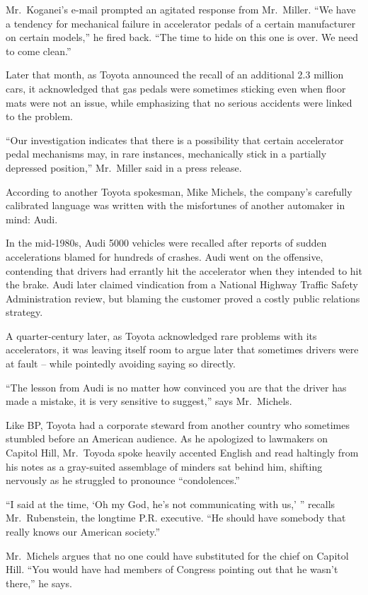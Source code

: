 ﻿\documentclass[12pt]{article}
\begin{document}
Mr.~Koganei's e-mail prompted an agitated response from Mr.~Miller. ``We have a tendency for
mechanical failure in accelerator pedals of a certain manufacturer on certain models,'' he fired
back. ``The time to hide on this one is over. We need to come clean.''

Later that month, as Toyota announced the recall of an additional 2.3 million cars, it acknowledged
that gas pedals were sometimes sticking even when floor mats were not an issue, while emphasizing
that no serious accidents were linked to the problem.

``Our investigation indicates that there is a possibility that certain accelerator pedal mechanisms
may, in rare instances, mechanically stick in a partially depressed position,'' Mr.~Miller said in a
press release.

According to another Toyota spokesman, Mike Michels, the company's carefully calibrated language was
written with the misfortunes of another automaker in mind: Audi.

In the mid-1980s, Audi 5000 vehicles were recalled after reports of sudden accelerations blamed for
hundreds of crashes. Audi went on the offensive, contending that drivers had errantly hit the
accelerator when they intended to hit the brake. Audi later claimed vindication from a National
Highway Traffic Safety Administration review, but blaming the customer proved a costly public
relations strategy.

A quarter-century later, as Toyota acknowledged rare problems with its accelerators, it was leaving
itself room to argue later that sometimes drivers were at fault -- while pointedly avoiding saying
so directly.

``The lesson from Audi is no matter how convinced you are that the driver has made a mistake, it is
very sensitive to suggest,'' says Mr.~Michels.

Like BP, Toyota had a corporate steward from another country who sometimes stumbled before an
American audience. As he apologized to lawmakers on Capitol Hill, Mr.~Toyoda spoke heavily accented
English and read haltingly from his notes as a gray-suited assemblage of minders sat behind him,
shifting nervously as he struggled to pronounce ``condolences.''

``I said at the time, `Oh my God, he's not communicating with us,' '' recalls Mr.~Rubenstein, the
longtime P.R. executive. ``He should have somebody that really knows our American society.''

Mr.~Michels argues that no one could have substituted for the chief on Capitol Hill. ``You would
have had members of Congress pointing out that he wasn't there,'' he says.
\end{document}

